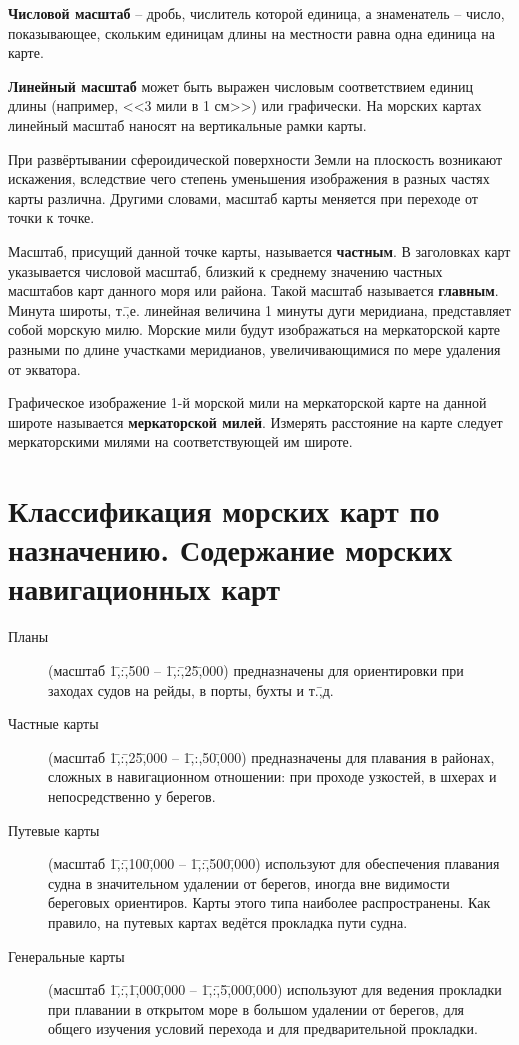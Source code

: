 \textbf{Числовой масштаб} \--- дробь,
числитель которой единица, а знаменатель \--- число, показывающее,
скольким единицам длины на местности равна одна единица на карте.

\textbf{Линейный масштаб} может быть
выражен числовым соответствием единиц длины (например, <<3 мили в 1
см>>) или графически. На морских картах линейный масштаб наносят на
вертикальные рамки карты.

При развёртывании сфероидической поверхности Земли на плоскость
возникают искажения, вследствие чего степень уменьшения изображения в
разных частях карты различна. Другими словами, масштаб карты меняется
при переходе от точки к точке.

Масштаб, присущий данной точке карты, называется \textbf{частным}. В
заголовках карт указывается числовой масштаб, близкий к среднему
значению частных масштабов карт данного моря или района. Такой масштаб
называется \textbf{главным}. Минута широты, т.\=,е. линейная величина
1 минуты дуги меридиана, представляет собой морскую милю. Морские мили
будут изображаться на меркаторской карте разными по длине участками
меридианов, увеличивающимися по мере удаления от экватора.

Графическое изображение 1-й морской мили на меркаторской карте на
данной широте называется \textbf{меркаторской
  милей}. Измерять расстояние на карте
следует меркаторскими милями на соответствующей им широте.

\section{Классификация морских карт по назначению. Содержание морских навигационных карт}

\begin{description} 
\item [Планы] (масштаб 1\=,:\=,500 \--- 1\=,:\=,25\=,000)
  предназначены для ориентировки при заходах судов на рейды, в порты,
  бухты и т.\=,д.
\item [Частные карты] (масштаб 1\=,:\=,25\=,000
  \--- 1\=,:\-,50\=,000) предназначены для плавания в районах, сложных
  в навигационном отношении: при проходе узкостей, в шхерах и
  непосредственно у берегов.
\item [Путевые карты] (масштаб 1\=,:\=,100\=,000
  \--- 1\=,:\=,500\=,000) используют для обеспечения плавания судна в
  значительном удалении от берегов, иногда вне видимости береговых
  ориентиров. Карты этого типа наиболее распространены. Как правило,
  на путевых картах ведётся прокладка пути судна.
\item [Генеральные карты] (масштаб
  1\=,:\=,1\=,000\=,000 \--- 1\=,:\=,5\=,000\=,000) используют для
  ведения прокладки при плавании в открытом море в большом удалении от
  берегов, для общего изучения условий перехода и для предварительной
  прокладки.
\end{description}

